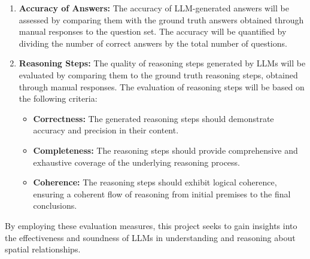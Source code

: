 \documentclass[journal,10pt]{IEEEtran}
\begin{document}
\begin{enumerate}
    \item \textbf{Accuracy of Answers:} The accuracy of LLM-generated answers will be assessed by comparing them with the ground truth answers obtained through manual responses to the question set. The accuracy will be quantified by dividing the number of correct answers by the total number of questions.
    \item \textbf{Reasoning Steps:} The quality of reasoning steps generated by LLMs will be evaluated by comparing them to the ground truth reasoning steps, obtained through manual responses. The evaluation of reasoning steps will be based on the following criteria:
    \begin{itemize}
        \item \textbf{Correctness:} The generated reasoning steps should demonstrate accuracy and precision in their content.
        \item \textbf{Completeness:} The reasoning steps should provide comprehensive and exhaustive coverage of the underlying reasoning process.
        \item \textbf{Coherence:} The reasoning steps should exhibit logical coherence, ensuring a coherent flow of reasoning from initial premises to the final conclusions.
    \end{itemize}
\end{enumerate}

By employing these evaluation measures, this project seeks to gain insights into the effectiveness and soundness of LLMs in understanding and reasoning about spatial relationships.
\end{document}

